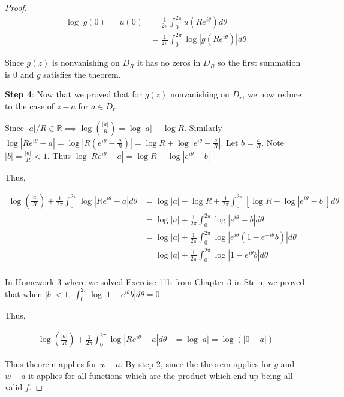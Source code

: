 \documentclass{article}
\newcommand{\R}{\mathbb{R}}
\newcommand{\abs}[1]{\left\lvert #1\right\rvert}
\begin{document}
\begin{proof}
    \begin{align*}
        \log\abs{g(0)} = u(0) &= \frac{1}{2 \pi} \int_{0}^{2 \pi} u(Re^{i \theta}) d \theta \\
        &= \frac{1}{2 \pi} \int_{0}^{2 \pi} \log\abs{g(Re^{i \theta})} d \theta
    \end{align*}

    Since $g(z)$ is nonvanishing on $D_R$ it has no zeros in $D_R$ so the first summation is 0 and $g$ satisfies the theorem. 
    
    \textbf{Step 4}: Now that we proved that for $g(z)$ nonvanishing on $D_r$, we now reduce to the case of $z - a$ for $a \in D_r$.
    

    Since $\abs{a} / R \in \R \implies \log\left(\frac{\abs{a}}{R}\right) = \log\abs{a} - \log{R}$. Similarly $\log\abs{Re^{i \theta} - a} = \log\abs{R(e^{i \theta} - \frac{a}{R})} = \log R + \log\abs{e^{i \theta} - \frac{a}{R}}$. Let $b = \frac{a}{R}$. Note $\abs{b} = \frac{\abs{a}}{R} < 1$.  Thus $\log\abs{Re^{i \theta} - a} = \log{R} - \log\abs{e^{i \theta} - b}$
    
    Thus, 

    \begin{align*}
        \log\left(\frac{\abs{a}}{R}\right) + \frac{1}{2 \pi} \int_{0}^{2 \pi} \log\abs{Re^{i \theta} - a} d \theta &= \log\abs{a} - \log{R} + \frac{1}{2 \pi}\int_{0}^{2 \pi} \left[\log{R} - \log\abs{e^{i \theta} - b}\right] d \theta \\
        &= \log\abs{a} + \frac{1}{2 \pi}\int_{0}^{2 \pi} \log\abs{e^{i \theta} - b} d \theta \\
        &= \log\abs{a} + \frac{1}{2 \pi}\int_{0}^{2 \pi} \log\abs{e^{i \theta} (1 - e^{-i \theta} b)} d \theta \\ 
        &= \log\abs{a} + \frac{1}{2 \pi}\int_{0}^{2 \pi} \log\abs{1 - e^{i \theta} b} d \theta \\
    \end{align*}

    In Homework 3 where we solved Exercise 11b from Chapter 3 in Stein, we proved that when $\abs{b} < 1$, $\int_{0}^{2 \pi} \log\abs{1 - e^{i \theta} b} d \theta = 0$ 

    Thus, 

    \begin{align*}
        \log\left(\frac{\abs{a}}{R}\right) + \frac{1}{2 \pi} \int_{0}^{2 \pi} \log\abs{Re^{i \theta} - a} d \theta &= \log\abs{a} = \log(\abs{0 - a})
    \end{align*}

    Thus theorem applies for $w - a$. By step 2, since the theorem applies for $g$ and $w -a$ it applies for all functions which are the product which end up being all valid $f$.    
\end{proof}
\end{document}
